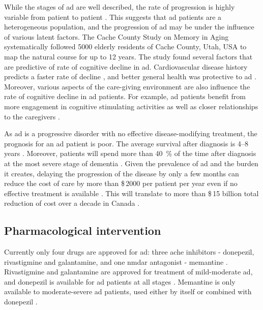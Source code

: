 While the stages of \gls{ad} are well described, the rate of progression is highly variable from patient to patient \citep{komarova11, tschanz11}. This suggests that \gls{ad} patients are a heterogeneous population, and the progression of \gls{ad} may be under the influence of various latent factors. The Cache County Study on Memory in Aging systematically followed \num{5000} elderly residents of Cache County, Utah, USA to map the natural course for up to \num{12} years. The study found several factors that are predictive of rate of cognitive decline in \gls{ad}. Cardiovascular disease history predicts a faster rate of decline \citep{mielke07}, and better general health was protective to \gls{ad} \citep{leoutsakos12}. Moreover, various aspects of the care-giving environment are also influence the rate of cognitive decline in \gls{ad} patients. For example, \gls{ad} patients benefit from more engagement in cognitive stimulating activities \citep{treiber11} as well as closer relationships to the caregivers \citep{norton09}.

As \gls{ad} is a progressive disorder with no effective disease-modifying treatment, the prognosis for an \gls{ad} patient is poor. The average survival after diagnosis is \numrange{4}{8} years \citep{larson04, helzner08}. Moreover, patients will spend more than \SI{40}{\percent} of the time after diagnosis at the most severe stage of dementia \citep{arrighi10}. Given the prevalence of \gls{ad} and the burden it creates, delaying the progression of the disease by only a few months can reduce the cost of care by more than \$\,\num{2000} per patient per year even if no effective treatment is available \citep{zhu06}. This will translate to more than \$\,15 billion total reduction of cost over a decade in Canada \citep{adc10}.

\subsection{Pharmacological intervention \label{treatment}}
Currently only four drugs are approved for \gls{ad}: three \gls{ache} inhibitors - donepezil, rivastigmine and galantamine, and one \gls{nmdar} antagonist - memantine \citep{nelson15}. Rivastigmine and galantamine are approved for treatment of mild-moderate \gls{ad}, and donepezil is available for \gls{ad} patients at all stages \citep{bassil09, smith09}. Memantine is only available to moderate-severe \gls{ad} patients, used either by itself or combined with donepezil \citep{nelson15}.


